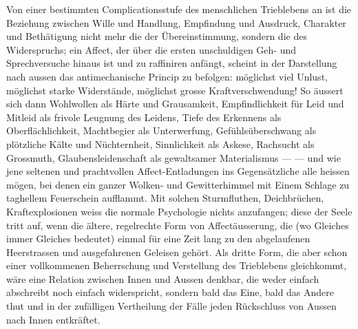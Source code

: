 Von einer bestimmten Complicationsstufe des menschlichen Trieblebens an ist die Beziehung zwischen Wille und Handlung, Empfindung und Ausdruck, Charakter und Bethätigung nicht mehr die der Übereinstimmung, sondern die des Widerspruchs; ein Affect, der über die ersten unschuldigen Geh- und Sprechversuche hinaus ist und zu raffiniren anfängt, scheint in der Darstellung nach aussen das antimechanische Princip zu befolgen: möglichst viel Unlust, möglichst starke Widerstände, möglichst grosse Kraftverschwendung! So äussert sich dann Wohlwollen als Härte und Grausamkeit, Empfindlichkeit für Leid und Mitleid als frivole Leugnung des Leidens, Tiefe des Erkennens als Oberflächlichkeit, Machtbegier als Unterwerfung, Gefühlsüberschwang als plötzliche Kälte und Nüchternheit, Sinnlichkeit als Askese, Rachsucht als Grossmuth, Glaubensleidenschaft als gewaltsamer Materialismus — — und wie jene seltenen und prachtvollen Affect-Entladungen ins Gegensätzliche alle heissen mögen, bei denen ein ganzer Wolken- und Gewitterhimmel mit Einem Schlage zu taghellem Feuerschein aufflammt. Mit solchen Sturmfluthen, Deichbrüchen, Kraftexplosionen weiss die normale Psychologie nichts anzufangen; diese  der Seele tritt auf, wenn die ältere, regelrechte Form von Affectäusserung, die  (wo Gleiches immer Gleiches bedeutet) einmal für eine Zeit lang zu den abgelaufenen Heerstrassen und ausgefahrenen Geleisen gehört. Als dritte Form, die aber schon einer vollkommenen Beherrschung und Verstellung des Trieblebens gleichkommt, wäre eine Relation zwischen Innen und Aussen denkbar, die weder einfach abschreibt noch einfach widerspricht, sondern bald das Eine, bald das Andere thut und in der zufälligen Vertheilung der Fälle jeden Rückschluss von Aussen nach Innen entkräftet.
\par


